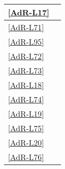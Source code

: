 \begin{longtable}{|P{6cm}|P{6cm}|}
	\hline \ref{AdR-L17} &  \\ %
	\hline \ref{AdR-L71} &  \\ %
	\hline \ref{AdR-L95} &  \\
	\hline \ref{AdR-L72} &  \\
	\hline \ref{AdR-L73} &  \\
	\hline \ref{AdR-L18} &  \\
	\hline \ref{AdR-L74} &  \\ %
	\hline \ref{AdR-L19} &  \\
	\hline \ref{AdR-L75} &  \\
	\hline \ref{AdR-L20} &  \\
	\hline \ref{AdR-L76} &  \\ %
	

\end{longtable}
